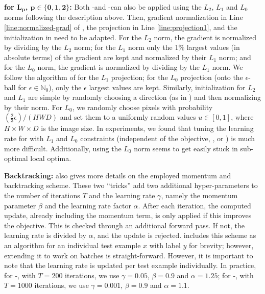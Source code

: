 \textbf{\PGD for $\boldsymbol{L_p}$, $\boldsymbol{p \in \{0, 1, 2\}}$:}
%
Both \PGD-\FCE and \PGD-\FConf can also be applied using the $L_2$, $L_1$ and $L_0$ norms following the description above. Then, gradient normalization in Line \ref{line:normalized-grad} of , the projection in Line \ref{line:projection1}, and the initialization in  need to be adapted. For the $L_2$ norm, the gradient is normalized by dividing by the $L_2$ norm; for the $L_1$ norm only the $1\%$ largest values (in absolute terms) of the gradient are kept and normalized by their $L_1$ norm; and for the $L_0$ norm, the gradient is normalized by dividing by the $L_1$ norm. We follow the algorithm of \cite{DuchiICML2008} for the $L_1$ projection; for the $L_0$ projection (onto the $\epsilon$-ball for $\epsilon \in \mathbb{N}_0$), only the $\epsilon$ largest values are kept. Similarly, initialization for $L_2$ and $L_1$ are simple by randomly choosing a direction (as in ) and then normalizing by their norm. For $L_0$, we randomly choose pixels with probability $(\frac{2}{3}\epsilon)/(HWD)$ and set them to a uniformly random values $u \in [0,1]$, where $H \times W \times D$ is the image size. In experiments, we found that tuning the learning rate for \PGD with $L_1$ and $L_0$ constraints (independent of the objective, \ie,  or ) is much more difficult. Additionally, \PGD using the $L_0$ norm seems to get easily stuck in sub-optimal local optima.

\textbf{Backtracking:}
%
 also gives more details on the employed momentum and backtracking scheme. These two ``tricks'' add two additional hyper-parameters to the number of iterations $T$ and the learning rate $\gamma$, namely the momentum parameter $\beta$ and the learning rate factor $\alpha$. After each iteration, the computed update, already including the momentum term, is only applied if this improves the objective. This is checked through an additional forward pass. If not, the learning rate is divided by $\alpha$, and the update is rejected.  includes this scheme as an algorithm for an individual test example $x$ with label $y$ for brevity; however, extending it to work on batches is straight-forward. However, it is important to note that the learning rate is updated per test example individually. In practice, for \PGD-\FCE, with $T = 200$ iterations, we use $\gamma = 0.05$, $\beta = 0.9$ and $\alpha = 1.25$; for \PGD-\FConf, with $T = 1000$ iterations, we use $\gamma = 0.001$, $\beta = 0.9$ and $\alpha = 1.1$.


